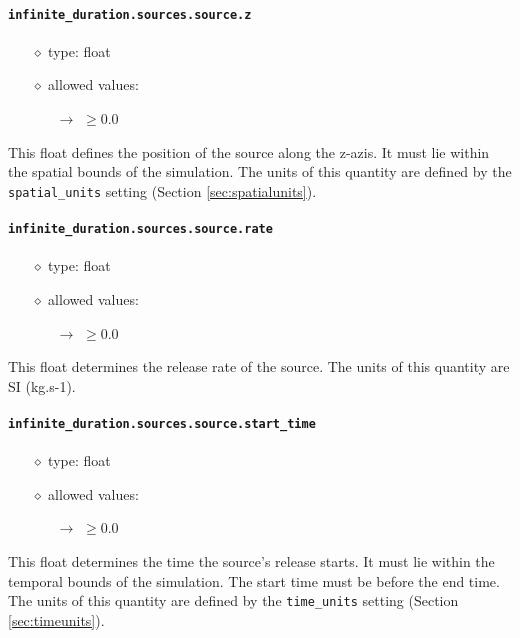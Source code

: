 \documentclass[]{article}
\def\code#1{\texttt{#1}}
\begin{document}
\paragraph{\code{infinite\_duration.sources.source.z}}\label{sec:infsourcez}
\begin{itemize}
    \item[$\diamond$] type: float 
    \item[$\diamond$] allowed values:
    \begin{itemize}
        \item[$\rightarrow$] $\geq0.0$
    \end{itemize}
\end{itemize}
This float defines the position of the source along the z-azis. It must lie
within the spatial bounds of the simulation. The units of this quantity are
defined by the \code{spatial\_units} setting (Section \ref{sec:spatialunits}).

\paragraph{\code{infinite\_duration.sources.source.rate}}\label{sec:infsourcerate}
\begin{itemize}
    \item[$\diamond$] type: float 
    \item[$\diamond$] allowed values:
    \begin{itemize}
        \item[$\rightarrow$] $\geq0.0$
    \end{itemize}
\end{itemize}
This float determines the release rate of the source. The units of this quantity
are SI (kg.s-1).

\paragraph{\code{infinite\_duration.sources.source.start\_time}}\label{sec:infsourcestarttime}
\begin{itemize}
    \item[$\diamond$] type: float 
    \item[$\diamond$] allowed values:
    \begin{itemize}
        \item[$\rightarrow$] $\geq0.0$
    \end{itemize}
\end{itemize}
This float determines the time the source's release starts. It must lie within
the temporal bounds of the simulation. The start time must be before the end
time. The units of this quantity are defined by the \code{time\_units} setting
(Section \ref{sec:timeunits}).
\end{document}
